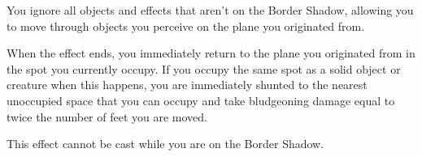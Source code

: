 You ignore all objects and effects that aren't on the Border Shadow, allowing you to move through objects you perceive on the plane you originated from.

When the effect ends, you immediately return to the plane you originated from in the spot you currently occupy. If you occupy the same spot as a solid object or creature when this happens, you are immediately shunted to the nearest unoccupied space that you can occupy and take bludgeoning damage equal to twice the number of feet you are moved.

This effect cannot be cast while you are on the Border Shadow.












